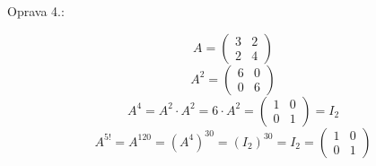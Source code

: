 \documentclass[10pt,a4paper]{article}
\begin{document}
Oprava 4.:

\begin{equation*}
A =
\begin{pmatrix}
3 & 2 \\
2 & 4
\end{pmatrix} 
\end{equation*}
\begin{equation*}
A^2 =
\begin{pmatrix}
6 & 0 \\
0 & 6
\end{pmatrix} 
\end{equation*}
\begin{equation*}
A^4 = A^2 \cdot A^2  = 6 \cdot A^2 =
\begin{pmatrix}
1 & 0 \\
0 & 1
\end{pmatrix}
= I_2
\end{equation*}
\begin{equation*}
A^{5!} = A^{120}  = (A^4)^{30} = (I_2)^{30} = I_2 = 
\begin{pmatrix}
1 & 0 \\
0 & 1
\end{pmatrix} 
\end{equation*}
\end{document}
